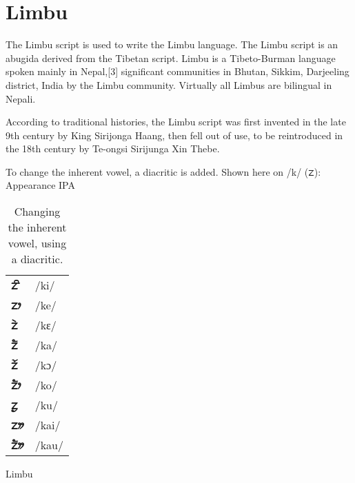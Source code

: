 
\section{Limbu}
\label{s:limbu}

The Limbu script is used to write the Limbu language. The Limbu script is an abugida derived from the Tibetan script. Limbu is a Tibeto-Burman language spoken mainly in Nepal,[3] significant communities in Bhutan, Sikkim, Darjeeling district, India by the Limbu community. Virtually all Limbus are bilingual in Nepali.

\newfontfamily{}

According to traditional histories, the Limbu script was first invented in the late 9th century by King Sirijonga Haang, then fell out of use, to be reintroduced in the 18th century by Te-ongsi Sirijunga Xin Thebe.

To change the inherent vowel, a diacritic is added. Shown here on /k/ ({\limbu ᤁ}):
Appearance	IPA

\begin{table}[htb]
\centering
\begin{tabular}{>{\Large\bfseries\limbu}l>{\arial}l}
ᤁᤡ	&/ki/\\
ᤁᤣ	&/ke/\\
ᤁᤧ	&/kɛ/\\
ᤁᤠ	&/ka/\\
ᤁᤨ	&/kɔ/\\
ᤁᤥ	&/ko/\\
ᤁᤢ	&/ku/\\
ᤁᤤ	&/kai/\\
ᤁᤦ	&/kau/\\
\end{tabular}
\caption{Changing the inherent vowel, using a diacritic.}
\end{table}




\begin{scriptexample}[]{Limbu}
\end{scriptexample}



